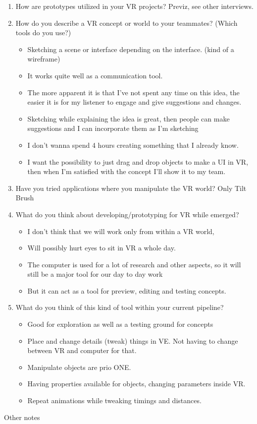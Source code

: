 \begin{enumerate}
\item How are prototypes utilized in your VR projects?
Previz, see other interviews.
\item How do you describe a VR concept or world to your teammates? (Which tools do you use?)
\begin{itemize}


\item Sketching a scene or interface depending on the interface. (kind of a wireframe)
\item It works quite well as a communication tool.
\item The more apparent it is that I've not spent any time on this idea, the easier it is for my listener to engage and give suggestions and changes.
\item Sketching while explaining the idea is great, then people can make suggestions and I can incorporate them as I'm sketching
\item I don't wanna spend 4 hours creating something that I already know.
\item I want the possibility to just drag and drop objects to make a UI in VR, then when I'm satisfied with the concept I'll show it to my team.

\end{itemize}
\item Have you tried applications where you manipulate the VR world?
Only Tilt Brush
\item What do you think about developing/prototyping for VR while emerged?
\begin{itemize}


\item I don't think that we will work only from within a VR world,
\item Will possibly hurt eyes to sit in VR a whole day.
\item The computer is used for a lot of research and other aspects, so it will still be a major tool for our day to day work
\item But it can act as a tool for preview, editing and testing concepts.
\end{itemize}
\item What do you think of this kind of tool within your current pipeline?
\begin{itemize}
\item Good for exploration as well as a testing ground for concepts
\item Place and change details (tweak) things in VE. Not having to change between VR and computer for that.
\item Manipulate objects are prio ONE.
\item Having properties available for objects, changing parameters inside VR.
\item Repeat animations while tweaking timings and distances.

\end{itemize}
\end{enumerate}
Other notes

